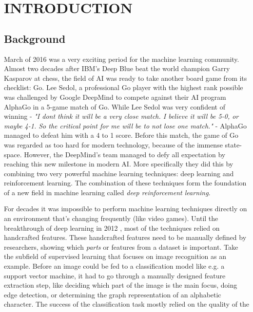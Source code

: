\chapter{INTRODUCTION}
\thispagestyle{fancy}
\setcounter{page}{1}


	\section{Background} 
        		March of 2016 was a very exciting period for the machine learning community. Almost two
        decades after IBM's Deep Blue beat the world champion Garry Kasparov at chess, the field of AI was
        ready to take another board game from its checklist: Go. Lee Sedol, a professional Go player with
        the highest rank possible was challenged by Google DeepMind to compete against their AI program
        AlphaGo in a 5-game match of Go. While Lee Sedol was very confident of winning - \textit{"I dont think it will
        be a very close match. I believe it will be 5-0, or maybe 4-1. So the critical point for me will be to not lose one
        match."} \cite{leesedol}- AlphaGo managed to defeat him with a 4 to 1 score. Before this match, the game of Go
        was regarded as too hard for modern technology, because of the immense state-space. However, the
        DeepMind's team managed to defy all expectation by reaching this new milestone in modern AI. More
        specifically they did this by combining two very powerful machine learning techniques: deep learning
        and reinforcement learning. The combination of these techniques form the foundation of a new field in
        machine learning called \textit{deep reinforcement learning}.
        \par
        For decades it was impossible to perform machine learning techniques directly on an environment that's changing frequently (like video games). Until the breakthrough of deep learning in 2012 \cite{Krizhevsky:2012:ICD:2999134.2999257}, most of the techniques relied on handcrafted
        features. These handcrafted features need to be manually defined by researchers, showing which \textit{parts} or features from a dataset is important. Take the subfield of supervised learning that focuses on image recognition as an example. Before an image could be fed to a classification model like e.g. a support vector machine, it had to go through a manually
        designed feature extraction step, like deciding which part of the image is the main focus, doing edge detection,  or determining the graph representation of an alphabetic character. The success of the classification task mostly relied on the quality of the
